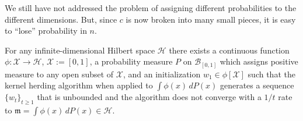\documentclass[10pt]{amsart}
\theoremstyle{definition}\newtheorem{defi}[theo]{Definition}\newtheorem{rema}[theo]{Remark}\newtheorem{exam}[theo]{Example}\newtheorem{exem}[theo]{Example}\newtheorem{nota}[theo]{Notation}
\theoremstyle{remark}
\newcommand{\X}{\mathcal{X}}
\newcommand{\cH}{\mathcal{H}}
\newcommand{\scB}{\mathscr{B}}
\newcommand{\mean}{\mathfrak{m}}
\begin{document}
We still have not addressed the problem of assigning different probabilities to the different dimensions. But, since $c$ is now broken into many small pieces, it is easy to ``lose'' probability in $n$.



\begin{prop}\label{Thm:CounterExample}
For any infinite-dimensional Hilbert space $\cH$ there exists a continuous function $\phi:\X \rightarrow \cH$, $\X:=[0,1]$, a probability measure $P$ on $\scB_{[0,1]}$ which assigns positive measure to any open subset of $\X$, and an initialization $w_1 \in \phi[\X]$ such that the kernel herding algorithm when applied to $\int \phi(x) \,dP(x)$ generates a sequence $\{w_t\}_{t\geq 1}$ that is unbounded and the algorithm does not converge with a $1/t$ rate to $\mean = \int \phi(x) \,dP(x) \in \cH$.
\end{prop}
\end{document}
